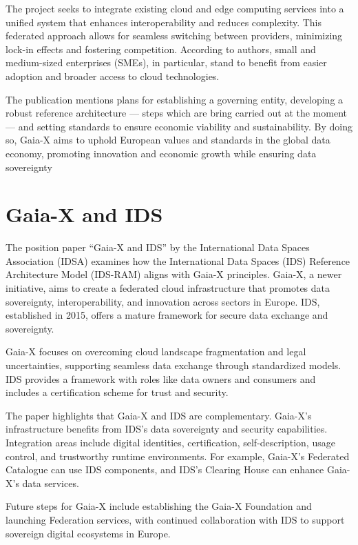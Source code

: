 The project seeks to integrate existing cloud and edge computing services into a unified system that enhances interoperability and reduces complexity.
This federated approach allows for seamless switching between providers, minimizing lock-in effects and fostering competition.
According to authors, small and medium-sized enterprises (SMEs), in particular, stand to benefit from easier adoption and broader access to cloud technologies.

The publication mentions plans for establishing a governing entity, developing a robust reference architecture --- steps which are bring carried out at the moment --- and setting standards to ensure economic viability and sustainability.
By doing so, Gaia-X aims to uphold European values and standards in the global data economy, promoting innovation and economic growth while ensuring data sovereignty

\section{Gaia-X and IDS}\label{sec:gaia-x-and-ids}

The position paper ``Gaia-X and IDS'' by the International Data Spaces Association (IDSA) examines how the International Data Spaces (IDS) Reference Architecture Model (IDS-RAM) aligns with Gaia-X principles\cite{gaiax_and_ids}.
Gaia-X, a newer initiative, aims to create a federated cloud infrastructure that promotes data sovereignty, interoperability, and innovation across sectors in Europe.
IDS, established in 2015, offers a mature framework for secure data exchange and sovereignty.

Gaia-X focuses on overcoming cloud landscape fragmentation and legal uncertainties, supporting seamless data exchange through standardized models.
IDS provides a framework with roles like data owners and consumers and includes a certification scheme for trust and security.

The paper highlights that Gaia-X and IDS are complementary.
Gaia-X's infrastructure benefits from IDS's data sovereignty and security capabilities.
Integration areas include digital identities, certification, self-description, usage control, and trustworthy runtime environments.
For example, Gaia-X's Federated Catalogue can use IDS components, and IDS's Clearing House can enhance Gaia-X's data services.

Future steps for Gaia-X include establishing the Gaia-X Foundation and launching Federation services, with continued collaboration with IDS to support sovereign digital ecosystems in Europe.

